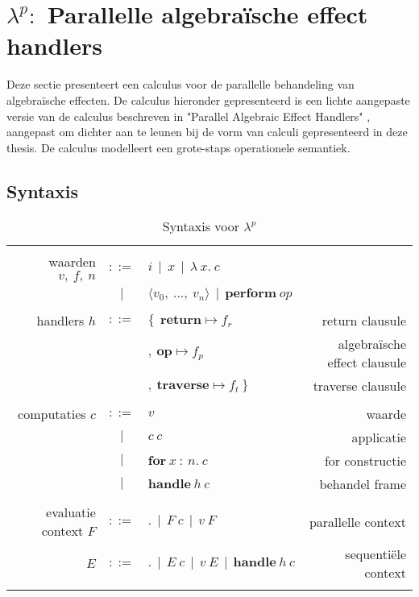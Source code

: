 \section{\texorpdfstring{$\lambda^{p}:$}{} Parallelle algebraïsche effect handlers} \label{hoofdstuk:startpuntParallel}
Deze sectie presenteert een calculus voor de parallelle behandeling van algebraïsche effecten. De calculus hieronder gepresenteerd is een lichte aangepaste versie van de calculus beschreven in "Parallel Algebraic Effect Handlers" \cite{Xie2021}, aangepast om dichter aan te leunen bij de vorm van calculi gepresenteerd in deze thesis. De calculus modelleert een grote-staps operationele semantiek. 

\subsection{Syntaxis}
\begin{table}
    \centering
    \begin{tabular}{|r c l r|}
    \hline
         & & & \\ 
         waarden $v,\:f,\:n$ & $::=$ & $i \: \: | \: \: x \: \: | \: \: \lambda \:x.\:c \: \:$ & \\
         & $|$ & $\langle v_{0},\: ... , \: v_{n} \rangle \: \: | \: \: \textbf{perform}\:op$ & \\
         & & & \\
         handlers $h$ & $::=$ & $\{ \: \: \textbf{return} \mapsto f_{r}$ & return clausule\\
         & & $, \: \textbf{op} \mapsto f_{p}$ & algebraïsche effect  clausule \\
         & & $, \: \textbf{traverse} \mapsto f_{t} \: \} $ & traverse clausule \\
         & & & \\
         computaties $c$ & $::=$ & $v$ & waarde \\
          & $|$ & $c\:c$ & applicatie \\
          & $|$ & $\textbf{for}\:x\::\:n.\:c$ & for constructie \\
          & $|$ & $\textbf{handle}\:h\:c$ & behandel frame \\
         & & & \\
         evaluatie context $F$ & $::=$ & $. \: \: | \: \: F \: c \: \: | \: \: v\:F$ & parallelle context \\
         $E$ & $::=$ & $. \: \: | \:\: E\:c \: \: | \: \: v\:E \:\: | \:\: \textbf{handle}\:h\:c$ & sequentiële context\\
         & & & \\
    \hline
    \end{tabular}
    \caption{Syntaxis voor $\lambda^{p}$}
    \label{fig:syntaxisPar}
\end{table}

